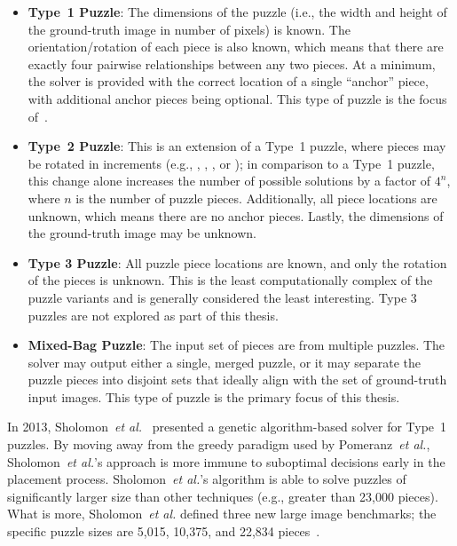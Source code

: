 \begin{itemize}

	\item \textbf{Type~1 Puzzle}: The dimensions of the puzzle (i.e., the width and height of the ground-truth image in number of pixels) is known.  The orientation/rotation of each piece is also known, which means that there are exactly four pairwise relationships between any two pieces.  At a minimum, the solver is provided with the correct location of a single ``anchor'' piece, with additional anchor pieces being optional.  This type of puzzle is the focus of~\cite{cho2010, pomeranz2011}.
	
	\item \textbf{Type~2 Puzzle}: This is an extension of a Type~1 puzzle, where pieces may be rotated in  increments (e.g., , , , or ); in comparison to a Type~1 puzzle, this change alone increases the number of possible solutions by a factor of $4^n$, where $n$ is the number of puzzle pieces.  Additionally, all piece locations are unknown, which means there are no anchor pieces.  Lastly, the dimensions of the ground-truth image may be unknown.
	
	\item \textbf{Type 3 Puzzle}: All puzzle piece locations are known, and only the rotation of the pieces is unknown.  This is the least computationally complex of the puzzle variants and is generally considered the least interesting.  Type 3 puzzles are not explored as part of this thesis.
	
	\item \textbf{Mixed-Bag Puzzle}: The input set of pieces are from multiple puzzles.  The solver may output either a single, merged puzzle, or it may separate the puzzle pieces into disjoint sets that ideally align with the set of ground-truth input images.  This type of puzzle is the primary focus of this thesis.

\end{itemize}

In 2013, Sholomon~\textit{et al.}~\cite{sholomon2013} presented a genetic algorithm-based solver for Type~1 puzzles.  By moving away from the greedy paradigm used by Pomeranz~\textit{et al.}, Sholomon~\textit{et al.}'s approach is more immune to suboptimal decisions early in the placement process. Sholomon~\textit{et al.}'s algorithm is able to solve puzzles of significantly larger size than other techniques (e.g., greater than 23,000 pieces).  What is more, Sholomon~\textit{et al.} defined three new large image benchmarks; the specific puzzle sizes are 5,015, 10,375, and 22,834 pieces~\cite{sholomonBenchmarkImages}.

